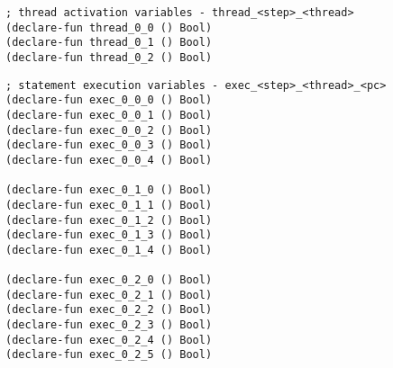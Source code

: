 \begin{algorithm}[H]
\end{algorithm}


\begin{algorithm}[H]
\end{algorithm}

\begin{algorithm}[H]
\end{algorithm}

\begin{lstlisting}[language=SMTLib]
; thread activation variables - thread_<step>_<thread>
(declare-fun thread_0_0 () Bool)
(declare-fun thread_0_1 () Bool)
(declare-fun thread_0_2 () Bool)
\end{lstlisting}


\begin{algorithm}[H]
\end{algorithm}

\begin{algorithm}[H]
\end{algorithm}

\begin{lstlisting}[language=SMTLib]
; statement execution variables - exec_<step>_<thread>_<pc>
(declare-fun exec_0_0_0 () Bool)
(declare-fun exec_0_0_1 () Bool)
(declare-fun exec_0_0_2 () Bool)
(declare-fun exec_0_0_3 () Bool)
(declare-fun exec_0_0_4 () Bool)

(declare-fun exec_0_1_0 () Bool)
(declare-fun exec_0_1_1 () Bool)
(declare-fun exec_0_1_2 () Bool)
(declare-fun exec_0_1_3 () Bool)
(declare-fun exec_0_1_4 () Bool)

(declare-fun exec_0_2_0 () Bool)
(declare-fun exec_0_2_1 () Bool)
(declare-fun exec_0_2_2 () Bool)
(declare-fun exec_0_2_3 () Bool)
(declare-fun exec_0_2_4 () Bool)
(declare-fun exec_0_2_5 () Bool)
\end{lstlisting}

